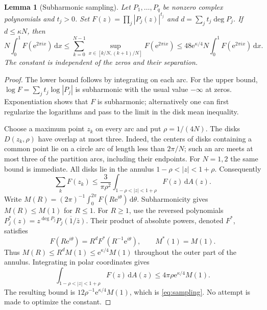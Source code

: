 \documentclass[11pt,a4paper]{article}
\numberwithin{equation}{section}
\newtheorem{lemma}[lemma]{Lemma}\aliascntresetthe{lemma}
\theoremstyle{definition}
\theoremstyle{remark}
\newcommand{\dd}{\,\mathrm d}
\newcommand{\ee}{\mathrm e}
\begin{document}
\begin{lemma}[Subharmonic sampling]
\label{lem:sampling}
Let $P_1,\ldots,P_q$ be nonzero complex polynomials and $t_j>0$.
Set $F(z)=\prod_j|P_j(z)|^{t_j}$ and
$d=\sum_jt_j\deg P_j$. If $d\le\kappa N$, then
\begin{equation}
 N\int_0^1F(\ee^{2\pi ix})\dd x
 \le \sum_{k=0}^{N-1}\sup_{x\in[k/N,(k+1)/N]}F(\ee^{2\pi ix})
 \le48\ee^{\kappa/4}N\int_0^1F(\ee^{2\pi ix})\dd x.
 \label{eq:sampling}
\end{equation}
The constant is independent of the zeros and their separation.
\end{lemma}
\begin{proof}
The lower bound follows by integrating on each arc. For the upper bound,
$\log F=\sum_jt_j\log|P_j|$ is subharmonic with the usual value
$-\infty$ at zeros. Exponentiation shows that $F$ is subharmonic;
alternatively one can first regularize the logarithms and pass to the
limit in the disk mean inequality.

Choose a maximum point $z_k$ on every arc and put $\rho=1/(4N)$.
The disks $D(z_k,\rho)$ have overlap at most three. Indeed, the centers
of disks containing a common point lie on a circle arc of length less
than $2\pi/N$; such an arc meets at most three of the partition arcs,
including their endpoints. For $N=1,2$ the same bound is immediate.
All disks lie in the annulus $1-\rho<|z|<1+\rho$. Consequently
\[
 \sum_kF(z_k)\le\frac3{\pi\rho^2}
            \int_{1-\rho<|z|<1+\rho}F(z)\dd A(z).
\]
Write $M(R)=(2\pi)^{-1}\int_0^{2\pi}F(R\ee^{i\theta})\dd\theta$.
Subharmonicity gives $M(R)\le M(1)$ for $R\le1$.
For $R\ge1$, use the reversed polynomials
$P_j^*(z)=z^{\deg P_j}\overline{P_j(1/\bar z)}$.
Their product of absolute powers, denoted $F^*$, satisfies
\[
 F(R\ee^{i\theta})=R^dF^*(R^{-1}\ee^{i\theta}),
 \qquad M^*(1)=M(1).
\]
Thus $M(R)\le R^dM(1)\le\ee^{\kappa/4}M(1)$ throughout the
outer part of the annulus. Integrating in polar coordinates gives
\[
 \int_{1-\rho<|z|<1+\rho}F(z)\dd A(z)
 \le4\pi\rho\ee^{\kappa/4}M(1).
\]
The resulting bound is $12\rho^{-1}\ee^{\kappa/4}M(1)$, which is
\cref{eq:sampling}. No attempt is made to optimize the constant.
\end{proof}
\end{document}
